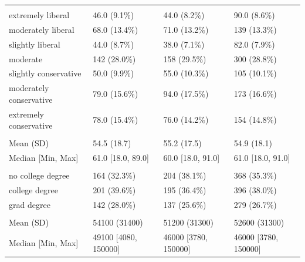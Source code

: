 \documentclass[
]{book}
\begin{document}
\begin{table}
\begin{tabular}[t]{llll}
\addlinespace[0.3em]
\multicolumn{4}{l}{\textbf{Political orientation}}\\
\hspace{1em}extremely liberal & 46.0 (9.1\%) & 44.0 (8.2\%) & 90.0 (8.6\%)\\
\hspace{1em}moderately liberal & 68.0 (13.4\%) & 71.0 (13.2\%) & 139 (13.3\%)\\
\hspace{1em}slightly liberal & 44.0 (8.7\%) & 38.0 (7.1\%) & 82.0 (7.9\%)\\
\hspace{1em}moderate & 142 (28.0\%) & 158 (29.5\%) & 300 (28.8\%)\\
\hspace{1em}slightly conservative & 50.0 (9.9\%) & 55.0 (10.3\%) & 105 (10.1\%)\\
\hspace{1em}moderately conservative & 79.0 (15.6\%) & 94.0 (17.5\%) & 173 (16.6\%)\\
\hspace{1em}extremely conservative & 78.0 (15.4\%) & 76.0 (14.2\%) & 154 (14.8\%)\\
\addlinespace[0.3em]
\multicolumn{4}{l}{\textbf{Age}}\\
\hspace{1em}Mean (SD) & 54.5 (18.7) & 55.2 (17.5) & 54.9 (18.1)\\
\hspace{1em}Median [Min, Max] & 61.0 [18.0, 89.0] & 60.0 [18.0, 91.0] & 61.0 [18.0, 91.0]\\
\addlinespace[0.3em]
\multicolumn{4}{l}{\textbf{Education}}\\
\hspace{1em}no college degree & 164 (32.3\%) & 204 (38.1\%) & 368 (35.3\%)\\
\hspace{1em}college degree & 201 (39.6\%) & 195 (36.4\%) & 396 (38.0\%)\\
\hspace{1em}grad degree & 142 (28.0\%) & 137 (25.6\%) & 279 (26.7\%)\\
\addlinespace[0.3em]
\multicolumn{4}{l}{\textbf{Adj. Income}}\\
\hspace{1em}Mean (SD) & 54100 (31400) & 51200 (31300) & 52600 (31300)\\
\hspace{1em}Median [Min, Max] & 49100 [4080, 150000] & 46000 [3780, 150000] & 46000 [3780, 150000]\\
\bottomrule
\end{tabular}
\end{table}
\end{document}

